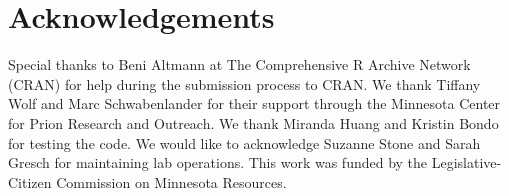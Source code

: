 \documentclass[preprint,12pt,a4paper]{elsarticle}
\begin{document}
    \section*{Acknowledgements}
        Special thanks to Beni Altmann at The Comprehensive R Archive Network (CRAN) for help during the submission process to CRAN. We thank Tiffany Wolf and Marc Schwabenlander for their support through the Minnesota Center for Prion Research and Outreach. We thank Miranda Huang and Kristin Bondo for testing the code. We would like to acknowledge Suzanne Stone and Sarah Gresch for maintaining lab operations. This work was funded by the Legislative-Citizen Commission on Minnesota Resources.


     
    
\end{document}
